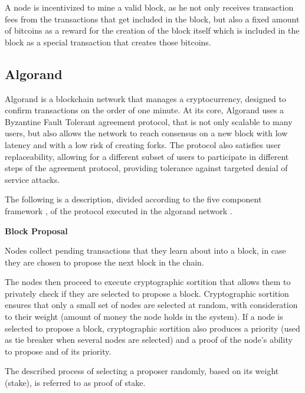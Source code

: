 A node is incentivized to mine a valid block, as he not only receives transaction fees from the transactions that get included in the block, but also a fixed amount of bitcoins as a reward for the creation of the block itself which is included in the block as a special transaction that creates those bitcoins.




\subsection{Algorand}

Algorand \cite{algorand_scale_byz_agreements} \cite{algorand_agreement} is a blockchain network that manages a cryptocurrency, designed to confirm transactions on the order of one minute. At its core, Algorand uses a Byzantine Fault Tolerant agreement protocol, that is not only scalable to many users, but also allows the network to reach consensus on a new block with low latency and with a low risk of creating forks. The protocol also satisfies user replaceability, allowing for a different subset of users to participate in different steps of the agreement protocol, providing tolerance against targeted denial of service attacks.

The following is a description, divided according to the five component framework \cite{survey_bchain_networks}, of the protocol executed in the algorand network \cite{algorand_scale_byz_agreements} \cite{algorand_agreement}.


\vspace{0.5cm}

\textbf{Block Proposal}

Nodes collect pending transactions that they learn about into a block, in case they are chosen to propose the next block in the chain.

The nodes then proceed to execute cryptographic sortition that allows them to privately check if they are selected to propose a block. Cryptographic sortition ensures that only a small set of nodes are selected at random, with consideration to their weight (amount of money the node holds in the system). If a node is selected to propose a block, cryptographic sortition also produces a priority (used as tie breaker when several nodes are selected) and a proof of the node’s ability to propose and of its priority.

The described process of selecting a proposer randomly, based on its weight (stake), is referred to as proof of stake.



